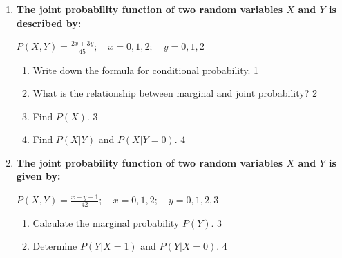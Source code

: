 \documentclass[a4paper,oneside, margin=1.4in]{book}
\begin{document}
\begin{enumerate}
  \begin{center}
  \( \displaystyle P(X,Y) = \frac{x + 2y}{28}; \quad x = 0, 1; \quad y = 0, 1, 2, 3 \)
  \end{center}
 
  \begin{enumerate}
    \item
    	Write down the formula for conditional probability. \hfill 1
    \item
    	What is the relationship between marginal and joint probability? \hfill 2
    \item
    	Find \( P(X) \). \hfill 3
    \item
     	Find \( P(X \vert Y) \) and \( P(X \vert Y = 0) \). \hfill 4
  \end{enumerate}

  \item
  \textbf{The joint probability function of two random variables \( X \) and \( Y \) is described by:}
  
  \begin{center}
  \( \displaystyle P(X,Y) = \frac{2x + 3y}{45}; \quad x = 0, 1, 2; \quad y = 0, 1, 2 \)
  \end{center}
 
  \begin{enumerate}
    \item
    	Write down the formula for conditional probability. \hfill 1
    \item
    	What is the relationship between marginal and joint probability? \hfill 2
    \item
    	Find \( P(X) \). \hfill 3
    \item
     	Find \( P(X \vert Y) \) and \( P(X \vert Y = 0) \). \hfill 4
  \end{enumerate}

  
  \item
  \textbf{The joint probability function of two random variables \( X \) and \( Y \) is given by:}
  
  \begin{center}
  \( \displaystyle P(X,Y) = \frac{x + y + 1}{42}; \quad x = 0, 1, 2; \quad y = 0, 1, 2, 3 \)
  \end{center}
 
  \begin{enumerate}
    \item
    	Calculate the marginal probability \( P(Y) \). \hfill 3
    \item
     	Determine \( P(Y \vert X = 1) \) and \( P(Y \vert X = 0) \). \hfill 4
  \end{enumerate}


\end{enumerate}
\end{document}
